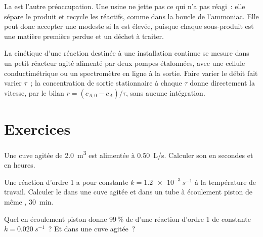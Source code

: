 La  est l'autre préoccupation. Une usine ne jette pas ce qui n'a pas
réagi~: elle sépare le produit et recycle les réactifs, comme dans la
boucle de l'ammoniac. Elle peut donc accepter une  modeste si la
 est élevée, puisque chaque sous-produit est une matière première perdue et un déchet à
traiter.

\begin{inthelab}
La cinétique d'une réaction destinée à une installation continue se mesure dans un
petit réacteur agité alimenté par deux pompes étalonnées, avec une cellule conductimétrique
ou un spectromètre en ligne à la sortie. Faire varier le débit fait varier $\tau$~;
la concentration de sortie stationnaire à chaque $\tau$ donne directement la vitesse, par le
bilan $r = (c_{A,0} - c_A)/\tau$, sans aucune intégration.
\end{inthelab}

\section{Exercices}

\begin{exercise}[$\star$]\label{exo:b2:continuous-reactors:1}
Une cuve agitée de \qty{2.0}{m^3} est alimentée à \qty{0.50}{L/s}. Calculer son
 en secondes et en heures.
\end{exercise}

\begin{exercise}[$\star$]\label{exo:b2:continuous-reactors:2}
Une réaction d'ordre 1 a pour constante $k = \qty{1.2e-3}{s^{-1}}$ à la température
de travail. Calculer le  dans une cuve agitée et dans un tube à écoulement piston
de même , \qty{30}{min}.
\end{exercise}

\begin{exercise}[$\star$]\label{exo:b2:continuous-reactors:3}
Quel  en écoulement piston donne 99\,\% de  d'une réaction
d'ordre 1 de constante $k = \qty{0.020}{s^{-1}}$~? Et dans une cuve agitée~?
\end{exercise}

